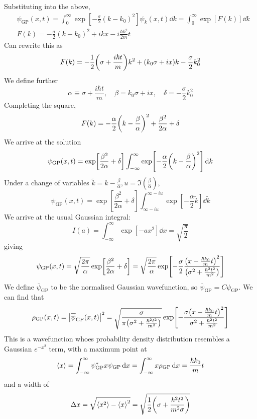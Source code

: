 \documentclass[a4paper]{article}
\begin{document}
Substituting into the above,
\begin{align*}
    &\psi_{\text{GP}}(x,t) = \int_0^\infty \exp[-\frac{\sigma}{2}(k-k_0)^2] \psi_k(x,t) \dd{k} = \int_0^\infty \exp[F(k)] \dd{k}\\ 
    & F(k) = -\frac{\sigma}{2}(k-k_0)^2 + ikx - i \frac{\hbar k^2}{2m} t
\end{align*}
Can rewrite this as
\[
	F(k) = -\frac{1}{2}\qty(\sigma + \frac{i \hbar t}{m}) k^2 + (k_0 \sigma + ix)k - \frac{\sigma}{2} k_0^2
\]
We define further
\[
	\alpha \equiv \sigma + \frac{i \hbar t}{m},\quad \beta = k_0 \sigma + ix,\quad \delta = -\frac{\sigma}{2} k_0^2
\]
Completing the square,
\[
	F(k) = -\frac{\alpha}{2} \qty(k - \frac{\beta}{\alpha})^2 + \frac{\beta^2}{2\alpha} + \delta
\]
We arrive at the solution
\[
	\psi_{\text{GP}}(x,t) = \exp[\frac{\beta^2}{2\alpha} + \delta] \int_{-\infty}^\infty \exp[-\frac{\alpha}{2}\qty(k - \frac{\beta}{\alpha})^2 ] \dd{k}
\]
Under a change of variables \( \widetilde k = k - \frac{\beta}{\alpha}, u = \Im(\frac{\beta}{\alpha}) \),
\[
	\psi_{\text{GP}}(x,t) = \exp[\frac{\beta^2}{2\alpha} + \delta] \int_{\infty - iu}^{\infty - iu} \exp[-\frac{\alpha}{2} \widetilde k] \dd{\widetilde k}
\]
We arrive at the usual Gaussian integral:
\[
	I(a) = \int_{-\infty}^\infty \exp[-a x^2] \dd{x} = \sqrt{\frac{\pi}{2}}
\]
giving
\[
	\psi_{\text{GP}}(x,t) = \sqrt{\frac{2 \pi}{\alpha}} \exp[\frac{\beta^2}{2\alpha} + \delta] = \sqrt{\frac{2\pi}{\alpha}} \exp[-\frac{\sigma}{2} \frac{\qty(x - \frac{\hbar k_0}{m} t)^2}{\qty(\sigma^2 + \frac{\hbar^2 t^2}{m^2} )} ]
\]
We define \( \overline \psi_{\text{GP}} \) to be the normalised Gaussian wavefunction, so \( \overline \psi_{\text{GP}} = C \psi_{\text{GP}} \).
We can find that
\[
	\rho_{\text{GP}}(x,t) = \abs{\overline \psi_{\text{GP}}(x,t)}^2 = \sqrt{\frac{\sigma}{\pi \qty(\sigma^2 + \frac{\hbar^2 t^2}{m^2})}} \exp[ - \frac{\sigma\qty(x - \frac{\hbar k_0}{m} t)^2}{\sigma^2 + \frac{\hbar^2 t^2}{m^2}} ]
\]
This is a wavefunction whoes probability density distribution resembles a Gaussian \( e^{-x^2} \) term, with a maximum point at
\[
	\left\langle{x}\right\rangle = \int_{-\infty}^\infty \psi_{\text{GP}}^* x \psi_{\text{GP}} \dd{x} = \int_{-\infty}^\infty x \rho_{\text{GP}} \dd{x} = \frac{\hbar k_0}{m} t
\]
and a width of
\[
	\Delta x = \sqrt{\left\langle{x^2}\right\rangle - \left\langle{x}\right\rangle^2} = \sqrt{\frac{1}{2} \qty(\sigma + \frac{\hbar^2 t^2}{m^2 \sigma})}
\]
\end{document}

